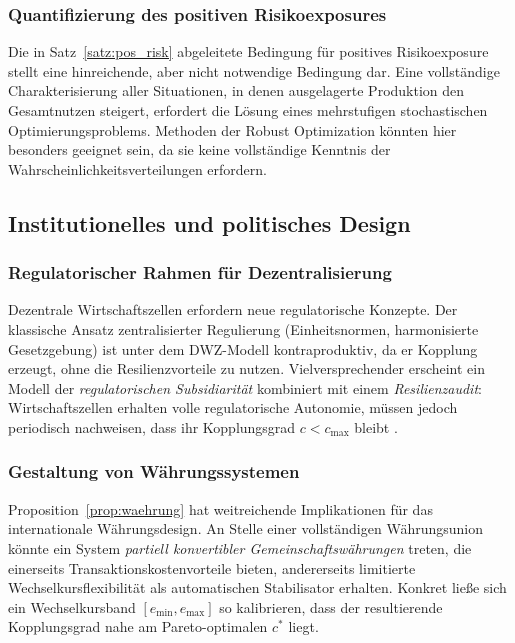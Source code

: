 \documentclass[a4paper, 12pt, twoside, openright]{report}
\theoremstyle{definition}
\theoremstyle{definition}
\begin{document}
\subsubsection{Quantifizierung des positiven Risikoexposures}

Die in Satz~\ref{satz:pos_risk} abgeleitete Bedingung für positives Risikoexposure stellt
eine hinreichende, aber nicht notwendige Bedingung dar. Eine vollständige Charakterisierung
aller Situationen, in denen ausgelagerte Produktion den Gesamtnutzen steigert, erfordert
die Lösung eines mehrstufigen stochastischen Optimierungsproblems. Methoden der Robust
Optimization \citep{ben2009robust} könnten hier besonders geeignet sein, da sie keine
vollständige Kenntnis der Wahrscheinlichkeitsverteilungen erfordern.

\subsection{Institutionelles und politisches Design}

\subsubsection{Regulatorischer Rahmen für Dezentralisierung}

Dezentrale Wirtschaftszellen erfordern neue regulatorische Konzepte. Der klassische
Ansatz zentralisierter Regulierung (Einheitsnormen, harmonisierte Gesetzgebung) ist
unter dem DWZ-Modell kontraproduktiv, da er Kopplung erzeugt, ohne die Resilienzvorteile
zu nutzen. Vielversprechender erscheint ein Modell der \emph{regulatorischen Subsidiarität}
kombiniert mit einem \emph{Resilienzaudit}: Wirtschaftszellen erhalten volle regulatorische
Autonomie, müssen jedoch periodisch nachweisen, dass ihr Kopplungsgrad $c < c_{\text{max}}$
bleibt \citep{ostrom1990governing}.

\subsubsection{Gestaltung von Währungssystemen}

Proposition~\ref{prop:waehrung} hat weitreichende Implikationen für das internationale
Währungsdesign. An Stelle einer vollständigen Währungsunion könnte ein System \emph{partiell
konvertibler Gemeinschaftswährungen} treten, die einerseits Transaktionskostenvorteile
bieten, andererseits limitierte Wechselkursflexibilität als automatischen Stabilisator
erhalten. Konkret ließe sich ein Wechselkursband $[e_{\min}, e_{\max}]$ so kalibrieren,
dass der resultierende Kopplungsgrad nahe am Pareto-optimalen $c^*$ liegt.
\end{document}
